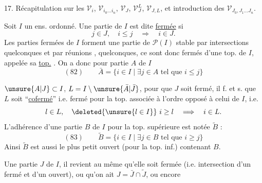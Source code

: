 
17. Récapitulation sur les $\mathcal V_i$, $\mathcal V_{i_0\ldots i_n}$, $\mathcal V_J$, $\mathcal V_J^L$, $\mathcal V_{J,L}$, et introduction des $\mathcal V_{J_0,J_1\ldots J_n}$.

Soit $I$ un ens. ordonné. Une partie  de $I$ est dite \uline{fermée} si
\[j\in J,\quad i\leq j\quad\Longrightarrow\quad i\in J.\]
Les parties fermées de $I$ forment une  partie de $\mathcal P(I)$ stable par intersections quelconques et par réunions , quelconques, ce sont donc   fermés d'une top. de $I$, appelée sa \uline{top.}  . On a donc pour  partie $A$ de $I$
\[
(82)\qquad\bar A=\{i\in I\mid\exists j\in A\text{ tel que }i\leq j\}
\]

  $\unsure{A|J}\subset I$, $L=I\setminus\unsure{\bar A|\bar J}$, pour que $J$ soit fermé,  il f. et s. que $L$ soit ``\uline{cofermé}'' i.e. fermé pour la top. associée à l'ordre opposé à  celui de $I$, i.e.
\[l\in L,\quad\deleted{\unsure{l\in I}}\ i\geq l\quad\Longrightarrow\quad i\in L.\]
L'adhérence d'une partie $B$ de $I$ pour la top. supérieure est notée $\widetilde B$ :
\[
(83)\qquad\widetilde B=\{i\in I\mid\exists j\in B\text{ tel que }i\geq j\}
\]
 Ainsi $\widetilde B$ est aussi le plus petit ouvert (pour la top. inf.) contenant $B$.

 Une partie $J$ de $I$, il revient au même qu'elle soit  fermée (i.e. intersection d'un fermé et d'un ouvert), ou qu'on ait $J=\bar J\cap\widetilde J$, ou encore
